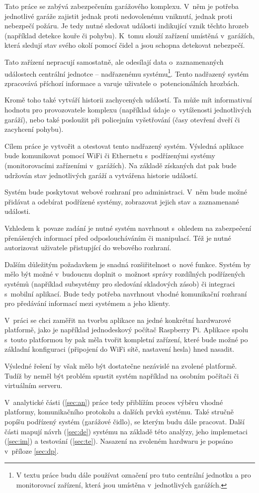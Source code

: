 Tato práce se zabývá zabezpečením garážového komplexu. V~něm je potřeba jednotlivé garáže zajistit jednak proti nedovolenému vniknutí, jednak proti nebezpečí požáru. Je tedy nutné sledovat události indikující vznik těchto hrozeb (například detekce kouře či pohybu). K~tomu slouží zařízení umístěná v~garážích, která sledují stav svého okolí pomocí čidel a jsou schopna detekovat nebezpečí. 

Tato zařízení nepracují samostatně, ale odesílají data o~zaznamenaných událostech centrální jednotce -- nadřazenému systému\footnote{V textu práce budu dále používat označení  pro tuto centrální jednotku a  pro monitorovací zařízení, která jsou umístěna v~jednotlivých garážích.}. Tento nadřazený systém zpracovává příchozí informace a varuje uživatele o~potencionálních hrozbách.

Kromě toho také vytváří historii zachycených událostí. Ta může mít informativní hodnotu pro provozovatele komplexu (například údaje o~vytíženosti jednotlivých garáží), nebo také posloužit při policejním vyšetřování (časy otevření dveří či zacyhcení pohybu).

Cílem práce je vytvořit a otestovat tento nadřazený systém. Výsledná aplikace bude komunikovat pomocí WiFi či Ethernetu s~podřízenými systémy (monitorovacími zařízeními v~garážích). Na základě získaných dat pak bude udržován stav jednotlivých garáží a vytvářena historie událostí.

Systém bude poskytovat webové rozhraní pro administraci. V~něm bude možné přidávat a odebírat podřízené systémy, zobrazovat jejich stav a zaznamenané události.

Vzhledem k~povaze zadání je nutné systém navrhnout s~ohledem na zabezpečení přenášených informací před odposloucháváním či manipulací. Též je nutné autorizovat uživatele přistupjící do webového rozhraní.

Dalším důležitým požadavkem je snadná rozšiřitelnost o~nové funkce. Systém by mělo být možné v~budoucnu doplnit o~možnost správy rozdílných podřízených systémů (například subsystémy pro sledování skladových zásob) či integraci s~mobilní aplikací. Bude tedy potřeba navrhnout vhodné komunikační rozhraní pro předávání informací mezi systémem a jeho klienty. 

V~práci se chci zaměřit na tvorbu aplikace na jedné konkrétní hardwarové platformě, jako je například jednodeskový počítač Raspberry Pi. Aplikace spolu s~touto platformou by pak měla tvořit kompletní zařízení, které bude možné po základní konfiguraci (připojení do WiFi sítě, nastavení hesla) hned nasadit.

Výsledné řešení by však mělo být dostatečne nezávislé na zvolené platformě. Tudíž by neměl být problém spustit systém například na osobním počítači či virtuálním serveru.

V~analytické části (\ref{sec:an}) práce tedy přiblížím proces výběru vhodné platformy, komunikačního protokolu a dalších prvků systému. Také stručně popíšu podřízený systém (garážové čidlo), se kterým budu dále pracovat. Další části mapují návrh (\ref{sec:de}) systému na základě této analýzy, jeho implemetaci (\ref{sec:im}) a testování (\ref{sec:te}). Nasazení na zvoleném hardwaru je popsáno v~příloze \ref{sec:dp}.